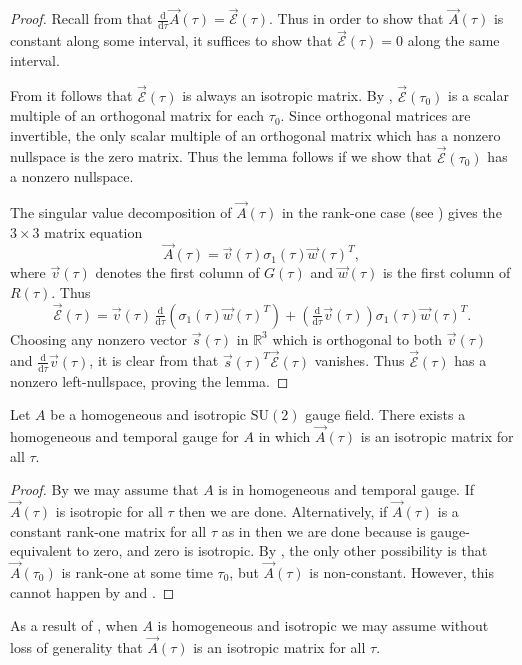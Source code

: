 \begin{proof}
Recall from  that $\tfrac{\mathrm{d}}{\mathrm{d}\tau}\vec{A}(\tau)=\vec{\mathcal{E}}(\tau)$. Thus in order to show that $\vec{A}(\tau)$ is constant along some interval, it suffices to show that $\vec{\mathcal{E}}(\tau)=0$ along the same interval. 

From  it follows that $\vec{\mathcal{E}}(\tau)$ is always an isotropic matrix. By , $\vec{\mathcal{E}}(\tau_{0})$ is a scalar multiple of an orthogonal matrix for each $\tau_{0}$. Since orthogonal matrices are invertible, the only scalar multiple of an orthogonal matrix which has a nonzero nullspace is the zero matrix. Thus the lemma follows if we show that $\vec{\mathcal{E}}(\tau_{0})$ has a nonzero nullspace. 

The singular value decomposition of $\vec{A}(\tau)$ in the rank-one case (see ) gives the $3\times3$ matrix equation 
\[
\vec{A}(\tau)=\vec{v}(\tau)\sigma_{1}(\tau)\vec{w}(\tau)^{T},
\]
 where $\vec{v}(\tau)$ denotes the first column of $G(\tau)$ and $\vec{w}(\tau)$ is the first column of $R(\tau)$. Thus 
\begin{equation}
\vec{\mathcal{E}}(\tau)=\vec{v}(\tau)\,\tfrac{\mathrm{d}}{\mathrm{d}\tau}\left(\sigma_{1}(\tau)\vec{w}(\tau)^{T}\right)+\left(\tfrac{\mathrm{d}}{\mathrm{d}\tau}\vec{v}(\tau)\right)\sigma_{1}(\tau)\vec{w}(\tau)^{T}.\label{eq:E-rk-1-as-derivative}
\end{equation}
 Choosing any nonzero vector $\vec{s}(\tau)$ in $\mathbb{R}^{3}$ which is orthogonal to both $\vec{v}(\tau)$ and $\tfrac{\mathrm{d}}{\mathrm{d}\tau}\vec{v}(\tau)$, it is clear from  that $\vec{s}(\tau)^{T}\vec{\mathcal{E}}(\tau)$ vanishes. Thus $\vec{\mathcal{E}}(\tau)$ has a nonzero left-nullspace, proving the lemma.
\end{proof}
\begin{thm}
\label{thm:rk1-is-gauge-artifact}Let $A$ be a homogeneous and isotropic $\mathrm{SU}(2)$ gauge field. There exists a homogeneous and temporal gauge for $A$ in which $\vec{A}(\tau)$ is an isotropic matrix for all $\tau$. 
\end{thm}

\begin{proof}
By  we may assume that $A$ is in homogeneous and temporal gauge. If $\vec{A}(\tau)$ is isotropic for all $\tau$ then we are done. Alternatively, if $\vec{A}(\tau)$ is a constant rank-one matrix for all $\tau$ as in  then we are done because  is gauge-equivalent to zero, and zero is isotropic. By , the only other possibility is that $\vec{A}(\tau_{0})$ is rank-one at some time $\tau_{0}$, but $\vec{A}(\tau)$ is non-constant. However, this cannot happen by  and . 
\end{proof}
As a result of , when $A$ is homogeneous and isotropic we may assume without loss of generality that $\vec{A}(\tau)$ is an isotropic matrix for all $\tau$. 
